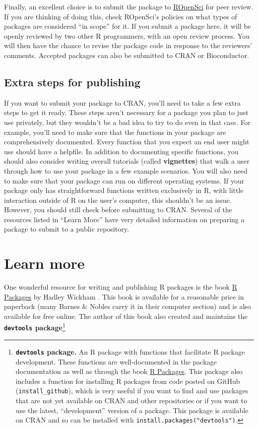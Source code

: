 \documentclass[]{tufte-book}
\begin{document}
Finally, an excellent choice is to submit the package to
\href{https://ropensci.org/}{ROpenSci} for peer review. If you are thinking of doing this,
check ROpenSci's policies on what types of packages are considered ``in scope'' for it.
If you submit a package here, it will be openly reviewed by two other R programmers,
with an open review process. You will then have the chance to revise the package
code in response to the reviewers' comments. Accepted packages can also be
submitted to CRAN or Bioconductor.

\hypertarget{extra-steps-for-publishing}{%
\subsection{Extra steps for publishing}\label{extra-steps-for-publishing}}

If you want to submit your package to CRAN, you'll need to take a few extra
steps to get it ready. These steps aren't necessary for a package you plan to
just use privately, but they wouldn't be a bad idea to try to do even in that
case. For example, you'll need to make sure that the functions in your package
are comprehensively documented. Every function that you expect an end user might
use should have a helpfile. In addition to documenting specific functions, you
should also consider writing overall tutorials (called \textbf{vignettes}) that walk
a user through how to use your package in a few example scenarios. You will also
need to make sure that your package can run on different operating systems. If
your package only has straightforward functions written exclusively in R, with
little interaction outside of R on the user's computer, this shouldn't be an
issue. However, you should still check before submitting to CRAN. Several of the
resources listed in ``Learn More'' have very detailed information on preparing a
package to submit to a public repository.

\hypertarget{learn-more-2}{%
\section{Learn more}\label{learn-more-2}}

One wonderful resource for writing and publishing R packages is the book \href{http://r-pkgs.had.co.nz/}{R
Packages} by Hadley Wickham \citep{wickham2015r}. This book is available
for a reasonable price in paperback (many Barnes \& Nobles carry it in their
computer section) and is also available for free online. The author of this book
also created and maintains the \textbf{\texttt{devtools} package}\footnote{\textbf{\texttt{devtools} package.}
  An R package with functions that facilitate R package development. These
  functions are well-documented in the package documentation as well as through
  the book \href{http://r-pkgs.had.co.nz/}{R Packages}. This package also includes a
  function for installing R packages from code posted on GitHub
  (\texttt{install\_github}), which is very useful if you want to find and use packages
  that are not yet available on CRAN and other repositories or if you want to use
  the latest, ``development'' version of a package. This package is available on
  CRAN and so can be installed with \texttt{install.packages("devtools")}.}
\end{document}
